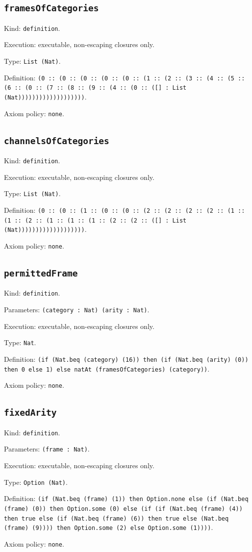 \documentclass[11pt]{article}
\begin{document}
\subsection*{\texttt{framesOfCategories}}
\noindent Kind: \texttt{definition}.\par
\noindent Execution: executable, non-escaping closures only.\par
\noindent Type: \texttt{List (Nat)}.\par
\noindent Definition: \texttt{(0 :: (0 :: (0 :: (0 :: (0 :: (1 :: (2 :: (3 :: (4 :: (5 :: (6 :: (0 :: (7 :: (8 :: (9 :: (4 :: (0 :: ([] : List (Nat)))))))))))))))))))}.\par
\noindent Axiom policy: \texttt{none}.\par
\subsection*{\texttt{channelsOfCategories}}
\noindent Kind: \texttt{definition}.\par
\noindent Execution: executable, non-escaping closures only.\par
\noindent Type: \texttt{List (Nat)}.\par
\noindent Definition: \texttt{(0 :: (0 :: (1 :: (0 :: (0 :: (2 :: (2 :: (2 :: (2 :: (1 :: (1 :: (2 :: (1 :: (1 :: (1 :: (2 :: (2 :: ([] : List (Nat)))))))))))))))))))}.\par
\noindent Axiom policy: \texttt{none}.\par
\subsection*{\texttt{permittedFrame}}
\noindent Kind: \texttt{definition}.\par
\noindent Parameters: \texttt{(category : Nat) (arity : Nat)}.\par
\noindent Execution: executable, non-escaping closures only.\par
\noindent Type: \texttt{Nat}.\par
\noindent Definition: \texttt{(if (Nat.beq (category) (16)) then (if (Nat.beq (arity) (0)) then 0 else 1) else natAt (framesOfCategories) (category))}.\par
\noindent Axiom policy: \texttt{none}.\par
\subsection*{\texttt{fixedArity}}
\noindent Kind: \texttt{definition}.\par
\noindent Parameters: \texttt{(frame : Nat)}.\par
\noindent Execution: executable, non-escaping closures only.\par
\noindent Type: \texttt{Option (Nat)}.\par
\noindent Definition: \texttt{(if (Nat.beq (frame) (1)) then Option.none else (if (Nat.beq (frame) (0)) then Option.some (0) else (if (if (Nat.beq (frame) (4)) then true else (if (Nat.beq (frame) (6)) then true else (Nat.beq (frame) (9)))) then Option.some (2) else Option.some (1))))}.\par
\noindent Axiom policy: \texttt{none}.\par
\end{document}
